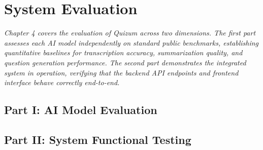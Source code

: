 \chapter{System Evaluation}

\textit{Chapter 4 covers the evaluation of Quizum across two dimensions. The first part assesses each AI model independently on standard public benchmarks, establishing quantitative baselines for transcription accuracy, summarization quality, and question generation performance. The second part demonstrates the integrated system in operation, verifying that the backend API endpoints and frontend interface behave correctly end-to-end.}

\section*{Part I: AI Model Evaluation}





\section*{Part II: System Functional Testing}



% 

